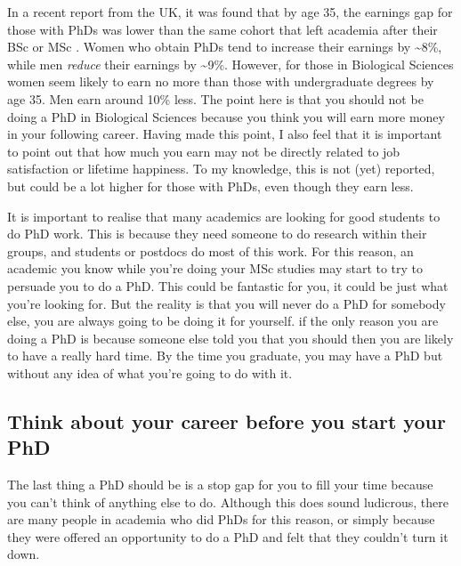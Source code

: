 \documentclass[
]{krantz}
\begin{document}
In a recent report from the UK, it was found that by age 35, the earnings gap for those with PhDs was lower than the same cohort that left academia after their BSc or MSc \citep{britton2020earnings}. Women who obtain PhDs tend to increase their earnings by \textasciitilde8\%, while men \emph{reduce} their earnings by \textasciitilde9\%. However, for those in Biological Sciences women seem likely to earn no more than those with undergraduate degrees by age 35. Men earn around 10\% less. The point here is that you should not be doing a PhD in Biological Sciences because you think you will earn more money in your following career. Having made this point, I also feel that it is important to point out that how much you earn may not be directly related to job satisfaction or lifetime happiness. To my knowledge, this is not (yet) reported, but could be a lot higher for those with PhDs, even though they earn less.

It is important to realise that many academics are looking for good students to do PhD work. This is because they need someone to do research within their groups, and students or postdocs do most of this work. For this reason, an academic you know while you're doing your MSc studies may start to try to persuade you to do a PhD. This could be fantastic for you, it could be just what you're looking for. But the reality is that you will never do a PhD for somebody else, you are always going to be doing it for yourself. if the only reason you are doing a PhD is because someone else told you that you should then you are likely to have a really hard time. By the time you graduate, you may have a PhD but without any idea of what you're going to do with it.

\hypertarget{think-about-your-career-before-you-start-your-phd}{%
\subsection{Think about your career before you start your PhD}\label{think-about-your-career-before-you-start-your-phd}}

The last thing a PhD should be is a stop gap for you to fill your time because you can't think of anything else to do. Although this does sound ludicrous, there are many people in academia who did PhDs for this reason, or simply because they were offered an opportunity to do a PhD and felt that they couldn't turn it down.
\end{document}
